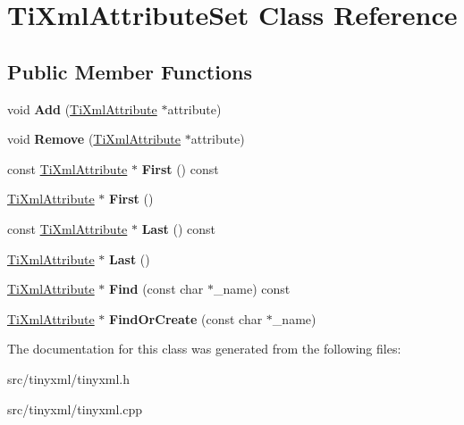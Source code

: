 \hypertarget{classTiXmlAttributeSet}{}\section{Ti\+Xml\+Attribute\+Set Class Reference}
\label{classTiXmlAttributeSet}
\subsection*{Public Member Functions}
\begin{DoxyCompactItemize}
\item 
void {\bfseries Add} (\hyperlink{classTiXmlAttribute}{Ti\+Xml\+Attribute} $\ast$attribute)\hypertarget{classTiXmlAttributeSet_a745e50ddaae3bee93e4589321e0b9c1a}{}\label{classTiXmlAttributeSet_a745e50ddaae3bee93e4589321e0b9c1a}

\item 
void {\bfseries Remove} (\hyperlink{classTiXmlAttribute}{Ti\+Xml\+Attribute} $\ast$attribute)\hypertarget{classTiXmlAttributeSet_a924a73d071f2573f9060f0be57879c57}{}\label{classTiXmlAttributeSet_a924a73d071f2573f9060f0be57879c57}

\item 
const \hyperlink{classTiXmlAttribute}{Ti\+Xml\+Attribute} $\ast$ {\bfseries First} () const \hypertarget{classTiXmlAttributeSet_ae0636e88cedd4b09d61c451860f68598}{}\label{classTiXmlAttributeSet_ae0636e88cedd4b09d61c451860f68598}

\item 
\hyperlink{classTiXmlAttribute}{Ti\+Xml\+Attribute} $\ast$ {\bfseries First} ()\hypertarget{classTiXmlAttributeSet_a99703bb08ca2aece2d7ef835de339ba0}{}\label{classTiXmlAttributeSet_a99703bb08ca2aece2d7ef835de339ba0}

\item 
const \hyperlink{classTiXmlAttribute}{Ti\+Xml\+Attribute} $\ast$ {\bfseries Last} () const \hypertarget{classTiXmlAttributeSet_a7b3f3ccf39a97bc25539d3fcc540296a}{}\label{classTiXmlAttributeSet_a7b3f3ccf39a97bc25539d3fcc540296a}

\item 
\hyperlink{classTiXmlAttribute}{Ti\+Xml\+Attribute} $\ast$ {\bfseries Last} ()\hypertarget{classTiXmlAttributeSet_ab4c4edfb2d74f6ea31aae096743bd6e0}{}\label{classTiXmlAttributeSet_ab4c4edfb2d74f6ea31aae096743bd6e0}

\item 
\hyperlink{classTiXmlAttribute}{Ti\+Xml\+Attribute} $\ast$ {\bfseries Find} (const char $\ast$\+\_\+name) const \hypertarget{classTiXmlAttributeSet_af3675cc2bfd0aea153cda1cfcdd1f77e}{}\label{classTiXmlAttributeSet_af3675cc2bfd0aea153cda1cfcdd1f77e}

\item 
\hyperlink{classTiXmlAttribute}{Ti\+Xml\+Attribute} $\ast$ {\bfseries Find\+Or\+Create} (const char $\ast$\+\_\+name)\hypertarget{classTiXmlAttributeSet_a5e28f5d32f048fba85d04dc317495bdc}{}\label{classTiXmlAttributeSet_a5e28f5d32f048fba85d04dc317495bdc}

\end{DoxyCompactItemize}


The documentation for this class was generated from the following files\+:\begin{DoxyCompactItemize}
\item 
src/tinyxml/tinyxml.\+h\item 
src/tinyxml/tinyxml.\+cpp\end{DoxyCompactItemize}
